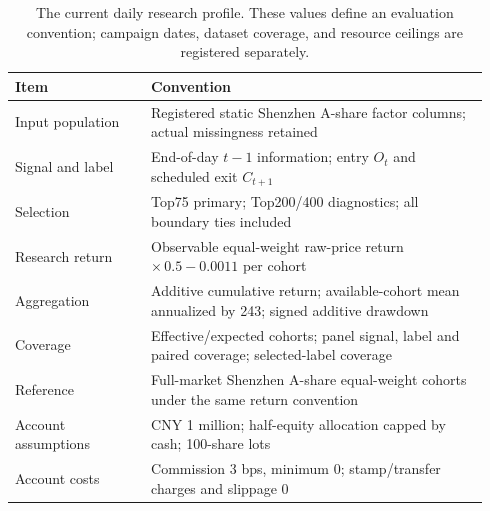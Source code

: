 \begin{table}[t]
    \centering
    \small
    \caption{The current daily research profile. These values define an evaluation convention; campaign dates, dataset coverage, and resource ceilings are registered separately.}
    \label{tab:daily_protocol}
    \begin{tabular}{@{}p{0.27\linewidth}p{0.67\linewidth}@{}}
        \toprule
        Item & Convention \\
        \midrule
        Input population & Registered static Shenzhen A-share factor columns; actual missingness retained \\
        Signal and label & End-of-day $t-1$ information; entry $O_t$ and scheduled exit $C_{t+1}$ \\
        Selection & Top75 primary; Top200/400 diagnostics; all boundary ties included \\
        Research return & Observable equal-weight raw-price return $\times\,0.5-0.0011$ per cohort \\
        Aggregation & Additive cumulative return; available-cohort mean annualized by 243; signed additive drawdown \\
        Coverage & Effective/expected cohorts; panel signal, label and paired coverage; selected-label coverage \\
        Reference & Full-market Shenzhen A-share equal-weight cohorts under the same return convention \\
        Account assumptions & CNY 1 million; half-equity allocation capped by cash; 100-share lots \\
        Account costs & Commission 3 bps, minimum 0; stamp/transfer charges and slippage 0 \\
        \bottomrule
    \end{tabular}
\end{table}
